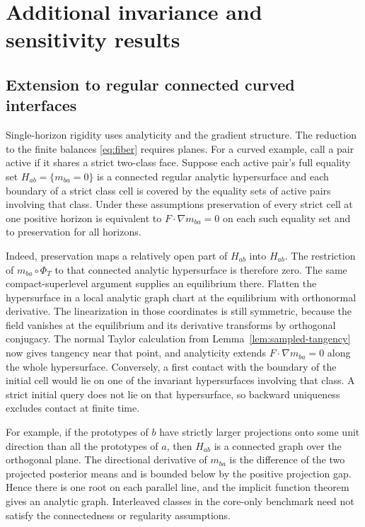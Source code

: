 \section{Additional invariance and sensitivity results}
\subsection{Extension to regular connected curved interfaces}
\label{sec:curved}
Single-horizon rigidity uses analyticity and the gradient structure.
The reduction to the finite balances \eqref{eq:fiber} requires planes.
For a curved example, call a pair active if it shares a strict
two-class face. Suppose each active pair's full equality set
$H_{ab}=\{m_{ba}=0\}$ is a connected regular analytic hypersurface
and each boundary of a strict class cell is covered by the equality
sets of active pairs involving that class. Under these assumptions
preservation of every strict cell at one positive horizon is
equivalent to $F\cdot\nabla m_{ba}=0$ on each such equality set and to
preservation for all horizons.

Indeed, preservation maps a relatively open part of $H_{ab}$
into $H_{ab}$. The restriction of $m_{ba}\circ\Phi_T$ to that
connected analytic hypersurface is therefore zero. The same
compact-superlevel argument supplies an equilibrium there. Flatten
the hypersurface in a local analytic graph chart at the equilibrium
with orthonormal derivative. The linearization in those coordinates
is still symmetric, because the field vanishes at the equilibrium
and its derivative transforms by orthogonal conjugacy. The normal
Taylor calculation from Lemma~\ref{lem:sampled-tangency} now gives tangency
near that point, and analyticity extends $F\cdot\nabla m_{ba}=0$
along the whole hypersurface. Conversely, a first contact with the
boundary of the initial cell would lie on one of the invariant
hypersurfaces involving that class. A strict initial query does
not lie on that hypersurface, so backward uniqueness excludes
contact at finite time.

For example, if the prototypes of $b$ have strictly larger
projections onto some unit direction than all the prototypes of
$a$, then $H_{ab}$ is a connected graph over the orthogonal plane.
The directional derivative of $m_{ba}$ is the difference of the
two projected posterior means and is bounded below by the positive
projection gap. Hence there is one root on each parallel line,
and the implicit function theorem gives an analytic graph.
Interleaved classes in the core-only benchmark need not satisfy
the connectedness or regularity assumptions.

